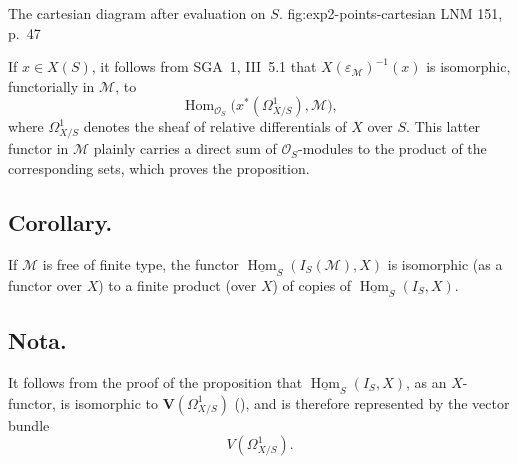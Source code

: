   {The cartesian diagram after evaluation on \(S\).}
  {fig:exp2-points-cartesian}
  {LNM 151, p.~47}

If \(x\in X(S)\), it follows from SGA~1, III~5.1 that
\(X(\varepsilon_{\mathcal M})^{-1}(x)\) is isomorphic, functorially in
\(\mathcal M\), to
\[
  \operatorname{Hom}_{\mathcal O_S}
    \bigl(x^*(\Omega^1_{X/S}),\mathcal M\bigr),
\]
where \(\Omega^1_{X/S}\) denotes the sheaf of relative differentials of
\(X\) over \(S\). This latter functor in \(\mathcal M\) plainly carries a
direct sum of \(\mathcal O_S\)-modules to the product of the corresponding
sets, which proves the proposition.

\subsection*{Corollary.}
If \(\mathcal M\) is free of finite type, the functor
\(\underline{\operatorname{Hom}}_S(I_S(\mathcal M),X)\) is isomorphic
\textup{(}as a functor over \(X\)\textup{)} to a finite product
\textup{(}over \(X\)\textup{)} of copies of
\(\underline{\operatorname{Hom}}_S(I_S,X)\).

\subsection*{Nota.}
It follows from the proof of the proposition that
\(\underline{\operatorname{Hom}}_S(I_S,X)\), as an \(X\)-functor, is
isomorphic to \(\mathbf V(\Omega^1_{X/S})\) (), and is therefore
represented by the vector bundle
\[
  V(\Omega^1_{X/S}).
\]
